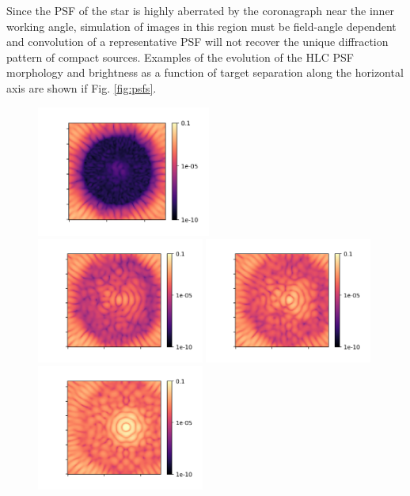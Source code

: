 \documentclass[]{spie}  %
\begin{document}
Since the \gls{PSF} of the star is highly aberrated by the coronagraph near the inner working angle, simulation of images in this region must be field-angle dependent and  convolution of a representative \gls{PSF} will not recover the unique diffraction pattern of compact sources. 
Examples of the evolution of the \gls{HLC} PSF morphology and brightness as a function of target separation along the horizontal axis are shown if Fig. \ref{fig:psfs}.



\begin{figure}
    \centering
    \includegraphics[width=0.51\textwidth]{0PSF.png}
    \includegraphics[width=0.49\textwidth]{17PSF_1lambdaD.png}
    \includegraphics[width=0.49\textwidth]{34PSF_2lambdaD.png}
    \includegraphics[width=0.49\textwidth]{51PSF.png}

\end{figure}
\end{document}
